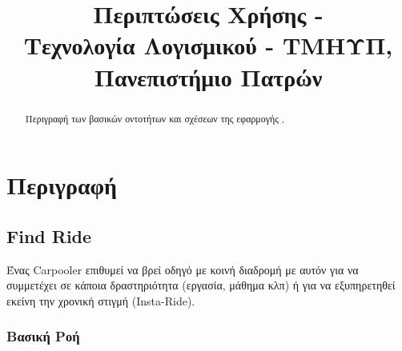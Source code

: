 

\fancyhead[R]{\leftmark}

\title{
    Περιπτώσεις Χρήσης - \appname\\[1ex]
    \large Τεχνολογία Λογισμικού - ΤΜΗΥΠ, Πανεπιστήμιο Πατρών \\[2ex]
}



\maketitle
\thispagestyle{empty}
\newpage

\tableofcontents
\newpage

\begin{abstract}
    Περιγραφή των βασικών οντοτήτων και σχέσεων της εφαρμογής \appname,
\end{abstract}

\newpage

\section{Περιγραφή}

\subsection{Find Ride}

Ένας Carpooler επιθυμεί να βρεί οδηγό με κοινή διαδρομή με αυτόν για να συμμετέχει
σε κάποια δραστηριότητα (εργασία, μάθημα κλπ) ή για να εξυπηρετηθεί εκείνη την
χρονική στιγμή (Insta-Ride).

\subsubsection{Βασική Ροή}

